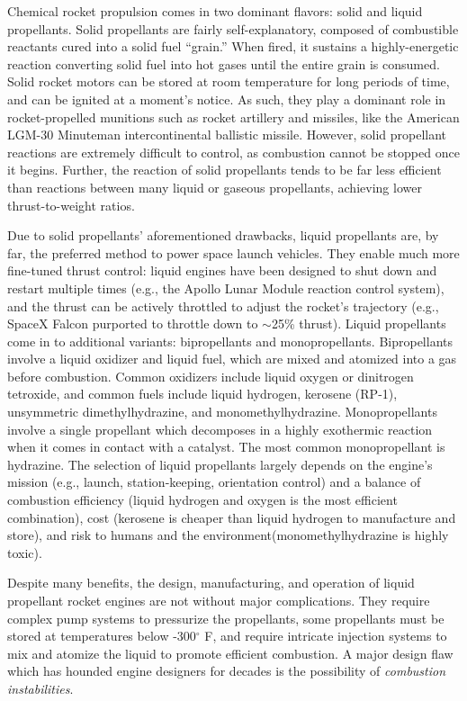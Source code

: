 Chemical rocket propulsion comes in two dominant flavors: solid and liquid propellants. Solid propellants are fairly self-explanatory, composed of combustible reactants cured into a solid fuel ``grain.'' When fired, it sustains a highly-energetic reaction converting solid fuel into hot gases until the entire grain is consumed. Solid rocket motors can be stored at room temperature for long periods of time, and can be ignited at a moment's notice. As such, they play a dominant role in rocket-propelled munitions such as rocket artillery and missiles, like the American LGM-30 Minuteman intercontinental ballistic missile. However, solid propellant reactions are extremely difficult to control, as combustion cannot be stopped once it begins. Further, the reaction of solid propellants tends to be far less efficient than reactions between many liquid or gaseous propellants, achieving lower thrust-to-weight ratios.

Due to solid propellants' aforementioned drawbacks, liquid propellants are, by far, the preferred method to power space launch vehicles. They enable much more fine-tuned thrust control: liquid engines have been designed to shut down and restart multiple times (e.g., the Apollo Lunar Module reaction control system), and the thrust can be actively throttled to adjust the rocket's trajectory (e.g., SpaceX Falcon purported to throttle down to $\sim$25\% thrust). Liquid propellants come in to additional variants: bipropellants and monopropellants. Bipropellants involve a liquid oxidizer and liquid fuel, which are mixed and atomized into a gas before combustion. Common oxidizers include liquid oxygen or dinitrogen tetroxide, and common fuels include liquid hydrogen, kerosene (RP-1), unsymmetric dimethylhydrazine, and monomethylhydrazine. Monopropellants involve a single propellant which decomposes in a highly exothermic reaction when it comes in contact with a catalyst. The most common monopropellant is hydrazine. The selection of liquid propellants largely depends on the engine's mission (e.g., launch, station-keeping, orientation control) and a balance of combustion efficiency (liquid hydrogen and oxygen is the most efficient combination), cost (kerosene is cheaper than liquid hydrogen to manufacture and store), and risk to humans and the environment(monomethylhydrazine is highly toxic).

Despite many benefits, the design, manufacturing, and operation of liquid propellant rocket engines are not without major complications. They require complex pump systems to pressurize the propellants, some propellants must be stored at temperatures below \mbox{-300$^{\circ}$} F, and require intricate injection systems to mix and atomize the liquid to promote efficient combustion. A major design flaw which has hounded engine designers for decades is the possibility of \textit{combustion instabilities}.

